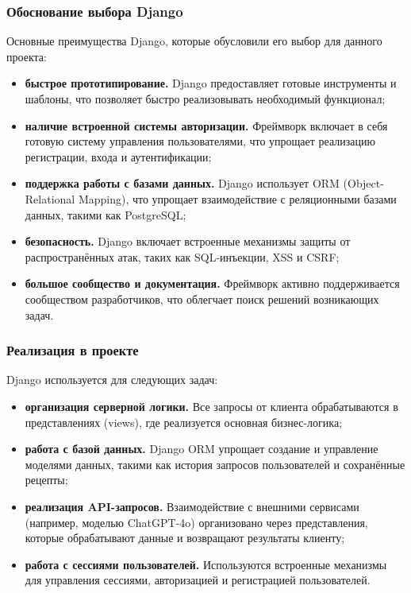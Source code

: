 {{\subsubsection*{Обоснование выбора Django}
Основные преимущества Django, которые обусловили его выбор для данного проекта:
\begin{itemize}
    \item \textbf{быстрое прототипирование.} Django предоставляет готовые инструменты и шаблоны, что позволяет быстро реализовывать необходимый функционал;
    \item \textbf{наличие встроенной системы авторизации.} Фреймворк включает в себя готовую систему управления пользователями, что упрощает реализацию регистрации, входа и аутентификации;
    \item \textbf{поддержка работы с базами данных.} Django использует ORM (Object-Relational Mapping), что упрощает взаимодействие с реляционными базами данных, такими как PostgreSQL;
    \item \textbf{безопасность.} Django включает встроенные механизмы защиты от распространённых атак, таких как SQL-инъекции, XSS и CSRF;
    \item \textbf{большое сообщество и документация.} Фреймворк активно поддерживается сообществом разработчиков, что облегчает поиск решений возникающих задач.
\end{itemize}

\subsubsection*{Реализация в проекте}
Django используется для следующих задач:
\begin{itemize}
    \item \textbf{организация серверной логики.} Все запросы от клиента обрабатываются в представлениях (views), где реализуется основная бизнес-логика;
    \item \textbf{работа с базой данных.} Django ORM упрощает создание и управление моделями данных, такими как история запросов пользователей и сохранённые рецепты;
    \item \textbf{реализация API-запросов.} Взаимодействие с внешними сервисами (например, моделью ChatGPT-4o) организовано через представления, которые обрабатывают данные и возвращают результаты клиенту;
    \item \textbf{работа с сессиями пользователей.} Используются встроенные механизмы для управления сессиями, авторизацией и регистрацией пользователей.
\end{itemize}

}}
